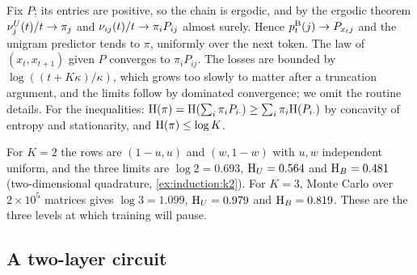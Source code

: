 \begin{refsection}

\begin{proofsketch}
Fix $P$; its entries are positive, so the chain is ergodic, and by the ergodic theorem $\nu^U_j(t)/t\to\pi_j$ and $\nu_{ij}(t)/t\to\pi_iP_{ij}$ almost surely. Hence $p^{\mathrm{B}}_t(j)\to P_{x_tj}$ and the unigram predictor tends to $\pi$, uniformly over the next token. The law of $(x_t,x_{t+1})$ given $P$ converges to $\pi_iP_{ij}$. The losses are bounded by $\log((t+K\kappa)/\kappa)$, which grows too slowly to matter after a truncation argument, and the limits follow by dominated convergence; we omit the routine details. For the inequalities: $\mathrm{H}(\pi)=\mathrm{H}(\sum_i\pi_iP_{i\cdot})\ge\sum_i\pi_i\mathrm{H}(P_{i\cdot})$ by concavity of entropy and stationarity, and $\mathrm{H}(\pi)\le\log K$.
\end{proofsketch}

For $K=2$ the rows are $(1-u,u)$ and $(w,1-w)$ with $u,w$ independent uniform, and the three limits are $\log2=0.693$, $\mathrm{H}_U=0.564$ and $\mathrm{H}_B=0.481$ (two-dimensional quadrature, \cref{ex:induction:k2}). For $K=3$, Monte Carlo over $2\times10^5$ matrices gives $\log3=1.099$, $\mathrm{H}_U=0.979$ and $\mathrm{H}_B=0.819$. These are the three levels at which training will pause.

\subsection{A two-layer circuit}


\end{refsection}

